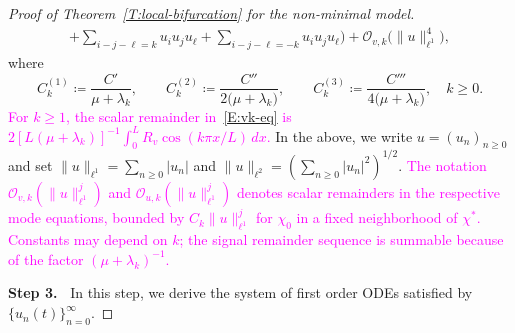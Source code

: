 \documentclass[11pt]{article} %
\theoremstyle{remark}
\theoremstyle{remark}
\numberwithin{equation}{section}
\numberwithin{figure}{section}
\numberwithin{table}{section}
\begin{document}
\begin{proof}[Proof of Theorem~\ref{T:local-bifurcation}  for the non-minimal model]
\begin{align}
    + \sum_{ i-j-\ell =  k } u_i u_j u_\ell
    + \sum_{ i-j-\ell = -k } u_i u_j u_\ell
    \Big)
    +\mathcal{O}_{v,k}\Big(\|u\|_{\ell^1}^4\Big),
  \end{align}
  where
  \begin{equation}\label{E:Ck-restated}
    C_k^{(1)} \coloneqq \frac{C'}{\mu+\lambda_k}, \qquad
    C_k^{(2)} \coloneqq \frac{C''}{2\bigl(\mu+\lambda_k\bigr)}, \qquad
    C_k^{(3)} \coloneqq \frac{C'''}{4\bigl(\mu+\lambda_k\bigr)},\quad
    k\ge0.
  \end{equation}
  \textcolor{magenta}{For $k\ge1$, the scalar remainder in~\eqref{E:vk-eq} is $2\left[L(\mu+\lambda_k)\right]^{-1}\int_0^L R_v\cos(k\pi x/L)\,dx$.}
  In the above, we write $u = (u_n)_{n\ge0}$ and set $\|u\|_{\ell^1}=\sum_{n\ge0}|u_n|$ and $\|u\|_{\ell^2}=\left(\sum_{n\ge0}|u_n|^2\right)^{1/2}$.
  \textcolor{magenta}{The notation $\mathcal{O}_{v,k}(\|u\|_{\ell^1}^j)$ and $\mathcal{O}_{u,k}(\|u\|_{\ell^1}^j)$ denotes scalar remainders in the respective mode equations, bounded by $C_k\|u\|_{\ell^1}^j$ for $\chi_0$ in a fixed neighborhood of $\chi^*$.
  Constants may depend on $k$; the signal remainder sequence is summable because of the factor $(\mu+\lambda_k)^{-1}$.}


  \smallskip

  \noindent\textbf{Step 3.~} In this step, we derive the system of first order
  ODEs satisfied by $\{u_n(t)\}_{n=0}^\infty$.


  \smallskip


\end{proof}
\end{document}
